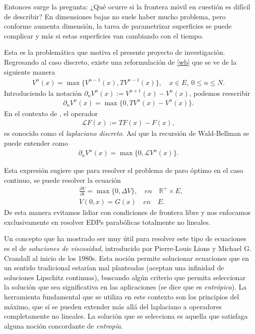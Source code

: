 \documentclass{article}
\numberwithin{equation}{section}
\begin{document}
Entonces surge la pregunta: ¿Qué ocurre si la frontera móvil en cuestión es difícil de describir?  En dimensiones bajas no suele haber mucho problema, pero conforme aumenta dimensión, la tarea de parametrizar  superficies se puede complicar y más si estas superficies van cambiando con el tiempo. 

Esta es la problemática que motiva el presente proyecto de investigación. Regresando al caso discreto, existe una reformulación de \eqref{wb} que se ve de la siguiente manera
\begin{align}
        V^n(x) = \max\{V^{n-1}(x), TV^{n-1}(x)\}, \quad x \in E, \: 0\leq n\leq N.
    \end{align}
Introduciendo la notación $\partial_nV^n(x) := V^{n+1}(x)-V^n(x)$, podemos reescribir
\begin{align}\label{no-lineal}
    \partial_nV^n(x) = \max\{0, TV^{n}(x)-V^{n}(x)\}.
\end{align}
En el contexto de \cite{lawler2010random}, el operador
\begin{align*}
   \mathcal{L}F(x) := TF(x)-F(x),
\end{align*}
es conocido como el \emph{laplaciano discreto}. Así que la recursión de Wald-Bellman se puede entender como
\begin{align}
    \partial_nV^n(x) = \max\{0, \mathcal{L}V^{n}(x)\}.
\end{align}

Esta expresión sugiere que para resolver el problema de paro 
óptimo en el caso continuo, se puede resolver la ecuación
\begin{align}\label{parabolic-non-linear}
    &\frac{\partial V}{\partial t} = \max\{0,\Delta V\}, \quad en \quad  \mathbb{R}^+\times E,\\
    &V(0,x) = G(x) \quad en \quad E.
\end{align}
De esta manera evitamos lidiar con condiciones de frontera libre y nos enfocamos exclusivamente en resolver EDPs parabólicas totalmente no lineales. 

Un concepto que ha mostrado ser muy útil para resolver este tipo de ecuaciones es el de \emph{soluciones de viscosidad}, introducido por  Pierre-Louis Lions y Michael G. Crandall al inicio de los 1980s. Esta noción permite solucionar ecuaciones que en un sentido tradicional estarían mal planteadas (aceptan una infinidad de soluciones Lipschitz continuas), buscando algún criterio que permita seleccionar la solución que sea significativa en las aplicaciones (se dice que es \emph{entrópica}). La herramienta fundamental que se utiliza en este contexto son los principios del máximo, que sí se pueden extender más allá del laplaciano a operadores completamente no lineales. La solución que se selecciona es aquella que satisfaga alguna noción concordante de \emph{entropía}.  
\end{document}
